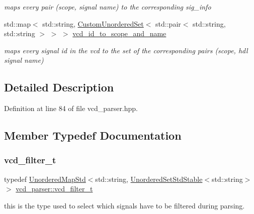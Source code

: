 \begin{DoxyCompactItemize}
\begin{DoxyCompactList}\small\item\em maps every pair (scope, signal name) to the corresponding sig\+\_\+info \end{DoxyCompactList}\item 
std\+::map$<$ std\+::string, \hyperlink{classCustomUnorderedSet}{Custom\+Unordered\+Set}$<$ std\+::pair$<$ std\+::string, std\+::string $>$ $>$ $>$ \hyperlink{classvcd__parser_aa85bc91897a99c588fb56c54a05fc359}{vcd\+\_\+id\+\_\+to\+\_\+scope\+\_\+and\+\_\+name}
\begin{DoxyCompactList}\small\item\em maps every signal id in the vcd to the set of the corresponding pairs (scope, hdl signal name) \end{DoxyCompactList}\end{DoxyCompactItemize}


\subsection{Detailed Description}


Definition at line 84 of file vcd\+\_\+parser.\+hpp.



\subsection{Member Typedef Documentation}
\mbox{\label{classvcd__parser_a00f10dd896fdc534014c6192eed18d55}} 
\subsubsection{\texorpdfstring{vcd\+\_\+filter\+\_\+t}{vcd\_filter\_t}}
{\footnotesize\ttfamily typedef \hyperlink{custom__map_8hpp_af22b2f058635373912f810498e5b1052}{Unordered\+Map\+Std}$<$std\+::string, \hyperlink{custom__set_8hpp_a1f63d303cef2790dc0a0ff7feae38f83}{Unordered\+Set\+Std\+Stable}$<$std\+::string$>$ $>$ \hyperlink{classvcd__parser_a00f10dd896fdc534014c6192eed18d55}{vcd\+\_\+parser\+::vcd\+\_\+filter\+\_\+t}}



this is the type used to select which signals have to be filtered during parsing. 

